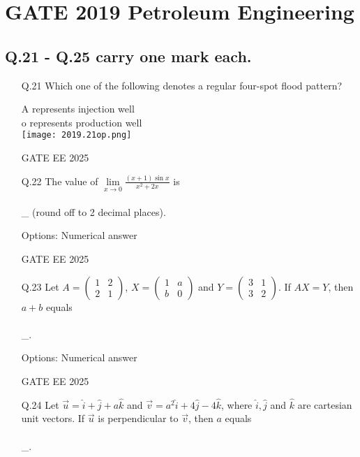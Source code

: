 \documentclass{article}
\begin{document}
\section*{GATE 2019 Petroleum Engineering}

\subsection*{Q.21 - Q.25 carry one mark each.}

\begin{enumerate}[leftmargin=*,series=q]
\setcounter{enumi}{20} %

\item[Q.21] Which one of the following denotes a regular four-spot flood pattern?

\noindent A represents injection well \\
\noindent o represents production well \\

\texttt{[image: 2019.21op.png]}

GATE EE 2025
 \vspace{0.5cm} 
\item[Q.22] The value of $\lim\limits_{x \to 0} \frac{(x+1)\sin x}{x^2 + 2x}$ is \\\\\_ (round off to 2 decimal places).

Options: Numerical answer

GATE EE 2025

\item[Q.23] Let $A = \begin{pmatrix} 1 & 2 \\ 2 & 1 \end{pmatrix}$, $X = \begin{pmatrix} 1 & a \\ b & 0 \end{pmatrix}$ and $Y = \begin{pmatrix} 3 & 1 \\ 3 & 2 \end{pmatrix}$. If $AX = Y$, then $a + b$ equals \\\\\_.

Options: Numerical answer

GATE EE 2025
 \vspace{0.5cm} 
\item[Q.24] Let $\vec{u} = \hat{i} + \hat{j} + a\hat{k}$ and $\vec{v} = a^2\hat{i} + 4\hat{j} - 4\hat{k}$, where $\hat{i}, \hat{j}$ and $\hat{k}$ are cartesian unit vectors. If $\vec{u}$ is perpendicular to $\vec{v}$, then $a$ equals \\\\\_.


\end{enumerate}
\end{document}

